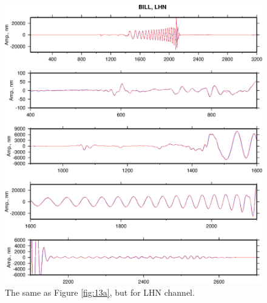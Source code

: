 \begin{figure}
\begin{center}
\includegraphics[width=7 in]{Figures/FigsBILLLHN}
\caption{ The same as Figure \ref{fig:13a}, but for LHN channel.}
\label{fig:14a}
\end{center}
\end{figure}

